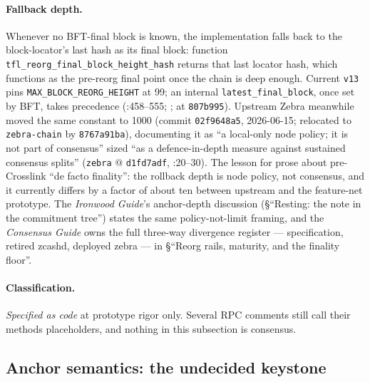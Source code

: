 \documentclass[11pt,a4paper]{article}
\theoremstyle{definition}
\begin{document}
\paragraph{Fallback depth.} Whenever no BFT-final block is known, the
implementation
falls back to the block-locator's last hash as its final block: function
\texttt{tfl\_reorg\_final\_block\_height\_hash} returns that last locator
hash, which functions as the pre-reorg final point once the chain is deep
enough. Current \texttt{v13} pins
\texttt{MAX\_BLOCK\_REORG\_HEIGHT} at 99; an
internal \texttt{latest\_final\_block}, once set by BFT, takes
precedence (:458--555;
;
 at
\texttt{807b995}). Upstream
Zebra meanwhile
moved the same constant to 1000 (commit \texttt{02f9648a5}, 2026-06-15;
relocated to \texttt{zebra-chain} by \texttt{8767a91ba}),
documenting it as ``a local-only node policy; it is not part of
consensus'' sized ``as a defence-in-depth measure against sustained
consensus splits'' (\texttt{zebra} @ \texttt{d1fd7adf},
:20--30).
The lesson for prose about pre-Crosslink ``de facto finality'': the
rollback depth is node policy, not consensus, and it currently differs by
a factor of about ten between upstream and the feature-net prototype.
The \emph{Ironwood Guide}'s anchor-depth discussion (\S``Resting:
the note in the commitment tree'') states the
same policy-not-limit framing, and the \emph{Consensus Guide} owns the
full three-way divergence register --- specification, retired
\textsf{zcashd}, deployed \textsf{zebra} --- in \S``Reorg rails,
maturity, and the finality floor''.

\paragraph{Classification.} \emph{Specified as code} at prototype rigor
only. Several RPC comments still call their methods placeholders, and
nothing in this subsection is consensus.

\subsection{Anchor semantics: the undecided keystone}
\label{sec:xl-anchors}
\end{document}
